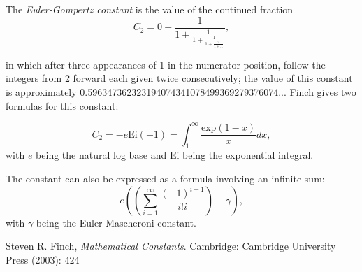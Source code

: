 \documentclass[12pt]{article}
\begin{document}
The {\em Euler-Gompertz constant} is the value of the continued fraction $$C_2 = 0 + \frac{1}{1 + \frac{1}{1 + \frac{1}{1 + \frac{2}{1 + \ldots}}}},$$ 

in which after three appearances of 1 in the numerator position, follow the integers from 2 forward each given twice consecutively; the value of this constant is approximately 0.596347362323194074341078499369279376074... Finch gives two formulas for this constant: 

$$C_2 = -e\textrm{Ei}(-1) = \int_1^\infty \frac{\textrm{exp}(1 - x)}{x} dx,$$ with $e$ being the natural log base and $\textrm{Ei}$ being the exponential integral. 

The constant can also be expressed as a formula involving an infinite sum: $$e \left( \left( \sum_{i = 1}^\infty \frac{(-1)^{i - 1}}{i!i} \right) - \gamma \right),$$ with $\gamma$ being the Euler-Mascheroni constant.

\begin{thebibliography}{1}
 Steven R. Finch, {\it Mathematical Constants}. Cambridge: Cambridge University Press (2003): 424
\end{thebibliography}
\end{document}
